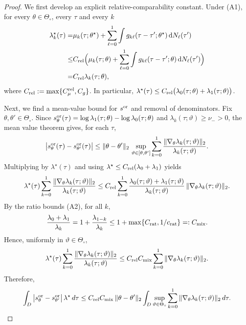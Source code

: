 \documentclass{statsoc}
\newcommand{\dd}{\mathrm{d}}
\newcommand{\1}{\mathbbm{1}}
\begin{document}
\begin{proof}
We first develop an explicit relative-comparability constant. Under (A1), for every \(\theta\in\Theta_\circ\), every $\tau$ and every $k$
\begin{align*}
\lambda_k^\star(\tau)
=&\mu_k(\tau;\theta^\star)+\sum_{\ell=0}^1\int g_{k\ell}(\tau-\tau';\theta^\star)\,\dd N_\ell(\tau')\\
\le&
C_{\rm rel}\Bigl(\mu_k(\tau;\theta)+\sum_{\ell=0}^1\int g_{k\ell}(\tau-\tau';\theta)\,\dd N_\ell(\tau')\Bigr)\\
=&
C_{\rm rel}\lambda_k(\tau;\theta),
\end{align*}
where \(C_{\rm rel}:= \max\{C_\mu^{\rm rel}, C_g\}\). In particular, \(\lambda^\star(\tau)\le C_{\rm rel}\bigl(\lambda_0(\tau;\theta)+\lambda_1(\tau;\theta)\bigr)\).

Next, we find a mean-value bound for $s^{\rm or}$ and removal of denominators. Fix $\theta,\theta'\in\Theta_\circ$. Since
$s^{\rm or}_\theta(\tau)=\log\lambda_1(\tau;\theta)-\log\lambda_0(\tau;\theta)$ and $\lambda_k(\tau;\vartheta)\ge \nu_->0$,
the mean value theorem gives, for each $\tau$,
\[
\big|s^{\rm or}_\theta(\tau)-s^{\rm or}_{\theta'}(\tau)\big|
\le
\|\theta-\theta'\|_2\,
\sup_{\vartheta\in[\theta,\theta']}
\sum_{k=0}^1\frac{\|\nabla_\theta \lambda_k(\tau;\vartheta)\|_2}{\lambda_k(\tau;\vartheta)}.
\]
Multiplying by $\lambda^\star(\tau)$ and using $\lambda^\star\le C_{\rm rel}(\lambda_0+\lambda_1)$ yields
\[
\lambda^\star(\tau)\sum_{k=0}^1\frac{\|\nabla_\theta \lambda_k(\tau;\vartheta)\|_2}{\lambda_k(\tau;\vartheta)}
\le
C_{\rm rel}\sum_{k=0}^1 \frac{\lambda_0(\tau;\vartheta)+\lambda_1(\tau;\vartheta)}{\lambda_k(\tau;\vartheta)}\,
\|\nabla_\theta \lambda_k(\tau;\vartheta)\|_2.
\]
By the ratio bounds (A2), for all $k$,
\[
\frac{\lambda_0+\lambda_1}{\lambda_k}
=1+\frac{\lambda_{1-k}}{\lambda_k}
\le 1+\max\{C_{\rm rat},1/c_{\rm rat}\}
=:C_{\rm mix}.
\]
Hence, uniformly in $\vartheta\in\Theta_\circ$,
\[
\lambda^\star(\tau)\sum_{k=0}^1\frac{\|\nabla_\theta \lambda_k(\tau;\vartheta)\|_2}{\lambda_k(\tau;\vartheta)}
\le
C_{\rm rel}C_{\rm mix}\sum_{k=0}^1 \|\nabla_\theta \lambda_k(\tau;\vartheta)\|_2.
\]
Therefore,
\begin{equation}
\label{eq:key-reduction}
\int_D \big|s^{\rm or}_\theta-s^{\rm or}_{\theta'}\big|\,\lambda^\star\,d\tau
\le
C_{\rm rel}C_{\rm mix}\,\|\theta-\theta'\|_2
\int_D \sup_{\vartheta\in\Theta_\circ}\sum_{k=0}^1\|\nabla_\theta \lambda_k(\tau;\vartheta)\|_2\,d\tau.
\end{equation}


\end{proof}
\end{document}
